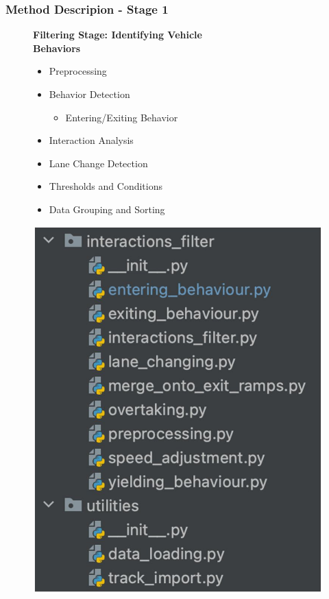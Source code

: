 \begin{frame}
  \frametitle{Method Descripion - Stage 1}

  \begin{figure}

    \begin{minipage}[b]{0.64\linewidth}
      \textbf{Filtering Stage: Identifying Vehicle \\ Behaviors}
      \begin{itemize}
          \item Preprocessing
          \item Behavior Detection
              \begin{itemize}
                  \item Entering/Exiting Behavior
              \end{itemize}
          \item Interaction Analysis
          \item Lane Change Detection
          \item Thresholds and Conditions
          \item Data Grouping and Sorting
      \end{itemize}
    \end{minipage}
    \begin{minipage}[b]{0.35\linewidth}

        \centering
        \includegraphics[width=1\textwidth]{figures/pictures_first_part/python_code_filter.jpeg}
    \end{minipage}
  \end{figure}
\end{frame}

